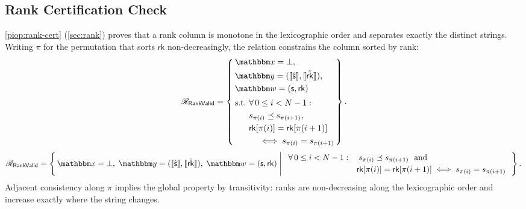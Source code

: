 \subsection{Rank Certification Check}
\label{sec:proof-rankvalid}
\cref{piop:rank-cert} (\cref{sec:rank}) proves that a rank column is monotone in the lexicographic order and separates exactly the distinct strings. Writing $\pi$ for the permutation that sorts $\mathsf{rk}$ non-decreasingly, the relation constrains the column sorted by rank:
\ifsp
\begin{displaymath}
\NPRelation_{\mathsf{RankValid}} = \left\{\,
  \begin{aligned}
    & \NPInstance = \bot,\\
    & \NPInstancey = (\Oracle{\hat{\strcol}}, \Oracle{\MLE{\mathsf{rk}}}),\\
    & \NPWitness = (\strcol, \mathsf{rk})\\[2pt]
    & \text{s.t.}\ \forall\, 0 \le i < N-1:\\
    & \phantom{\text{s.t.}}\ s_{\pi(i)} \lexle s_{\pi(i+1)},\\
    & \phantom{\text{s.t.}}\ \mathsf{rk}[\pi(i)] = \mathsf{rk}[\pi(i+1)]\\
    & \phantom{\text{s.t.}}\ \quad \iff s_{\pi(i)} = s_{\pi(i+1)}
  \end{aligned}
\,\right\}.
\end{displaymath}
\else
\begin{displaymath}
\NPRelation_{\mathsf{RankValid}} = \left\{\,
  \NPInstance = \bot,\;
  \NPInstancey = (\Oracle{\hat{\strcol}}, \Oracle{\MLE{\mathsf{rk}}}),\;
  \NPWitness = (\strcol, \mathsf{rk})
  \;\middle|\;
  \begin{array}{l}
    \forall\, 0 \le i < N-1:\quad s_{\pi(i)} \lexle s_{\pi(i+1)}\ \text{ and} \\[3pt]
    \phantom{\forall\, 0 \le i < N-1:\quad} \mathsf{rk}[\pi(i)] = \mathsf{rk}[\pi(i+1)] \iff s_{\pi(i)} = s_{\pi(i+1)}
  \end{array}
\,\right\}.
\end{displaymath}
\fi
Adjacent consistency along $\pi$ implies the global property by transitivity: ranks are non-decreasing along the lexicographic order and increase exactly where the string changes.

